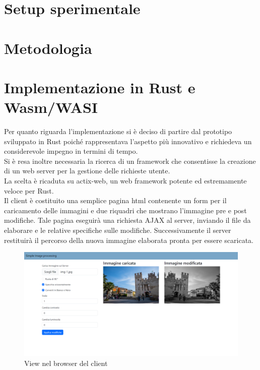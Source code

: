 \section{Setup sperimentale}
\section{Metodologia}
\newpage
\section{Implementazione in Rust e Wasm/WASI}
Per quanto riguarda l'implementazione si è deciso di partire dal prototipo sviluppato in Rust poiché rappresentava l'aspetto più innovativo e richiedeva un considerevole impegno in termini di tempo.
\\Si è resa inoltre necessaria la ricerca di un framework che consentisse la creazione di un web server per la gestione delle richieste utente.
\\La scelta è ricaduta su actix-web, un web framework potente ed estremamente veloce per Rust.
\\Il client è costituito una semplice pagina html contenente un form per il caricamento delle immagini e due riquadri che mostrano l'immagine pre e post modifiche. Tale pagina eseguirà una richiesta AJAX al server, inviando il file da elaborare e le relative specifiche sulle modifiche. Successivamente il server restituirà il percorso della nuova immagine elaborata pronta per essere scaricata.
\begin{figure}
    \begin{center}
            \includegraphics[width=1\columnwidth]{images/client.png}
    \end{center}
    \caption{View nel browser del client}
    \label{fig:client}
\end{figure}
